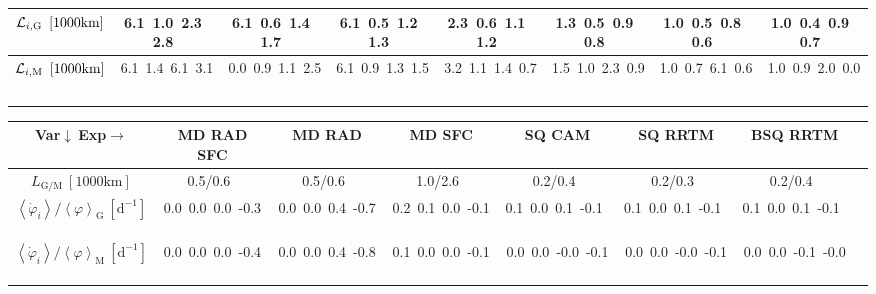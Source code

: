 \begin{table}[H]
{\begin{centering}
\begin{tabular}{|c|c|c|c|c|c|c|c|}
\hline
${\cal L}_{i,\mathrm{G}}\ \left[1000\mathrm{km}\right]$ & \textcolor{C1}{6.1}\ \textcolor{C2}{1.0}\ \textcolor{C3}{2.3}\ \textcolor{C4}{2.8}\  & \textcolor{C1}{6.1}\ \textcolor{C2}{0.6}\ \textcolor{C3}{1.4}\ \textcolor{C4}{1.7}\  & \textcolor{C1}{6.1}\ \textcolor{C2}{0.5}\ \textcolor{C3}{1.2}\ \textcolor{C4}{1.3}\  & \textcolor{C1}{2.3}\ \textcolor{C2}{0.6}\ \textcolor{C3}{1.1}\ \textcolor{C4}{1.2}\  & \textcolor{C1}{1.3}\ \textcolor{C2}{0.5}\ \textcolor{C3}{0.9}\ \textcolor{C4}{0.8}\  & \textcolor{C1}{1.0}\ \textcolor{C2}{0.5}\ \textcolor{C3}{0.8}\ \textcolor{C4}{0.6}\  & \textcolor{C1}{1.0}\ \textcolor{C2}{0.4}\ \textcolor{C3}{0.9}\ \textcolor{C4}{0.7}\  \tabularnewline
\hline
${\cal L}_{i,\mathrm{M}}\ \left[1000\mathrm{km}\right]$ & \textcolor{C1}{6.1}\ \textcolor{C2}{1.4}\ \textcolor{C3}{6.1}\ \textcolor{C4}{3.1}\  & \textcolor{C1}{0.0}\ \textcolor{C2}{0.9}\ \textcolor{C3}{1.1}\ \textcolor{C4}{2.5}\  & \textcolor{C1}{6.1}\ \textcolor{C2}{0.9}\ \textcolor{C3}{1.3}\ \textcolor{C4}{1.5}\  & \textcolor{C1}{3.2}\ \textcolor{C2}{1.1}\ \textcolor{C3}{1.4}\ \textcolor{C4}{0.7}\  & \textcolor{C1}{1.5}\ \textcolor{C2}{1.0}\ \textcolor{C3}{2.3}\ \textcolor{C4}{0.9}\  & \textcolor{C1}{1.0}\ \textcolor{C2}{0.7}\ \textcolor{C3}{6.1}\ \textcolor{C4}{0.6}\  & \textcolor{C1}{1.0}\ \textcolor{C2}{0.9}\ \textcolor{C3}{2.0}\ \textcolor{C4}{0.0}\  \tabularnewline
\hline
 &  &  &  &  &  &  & \tabularnewline
\hline
\end{tabular}
\begin{tabular}{|c|c|c|c|c|c|c|c|}
\hline
Var$\downarrow\ $Exp$\rightarrow$ & MD RAD SFC & MD RAD & MD SFC & SQ CAM & SQ RRTM & BSQ RRTM \tabularnewline
\hline
\hline
$L_{\mathrm{G/M}}\ \left[1000\mathrm{km}\right]$ & 0.5/0.6\ & 0.5/0.6\ & 1.0/2.6\ & 0.2/0.4\ & 0.2/0.3\ & 0.2/0.4\ \tabularnewline
\hline
$\left\langle \dot{\varphi}_{i}\right\rangle /\left\langle \varphi\right\rangle _{\mathrm{G}}\ \left[\mathrm{d^{-1}}\right]$ & \textcolor{C1}{0.0}\ \textcolor{C2}{0.0}\ \textcolor{C3}{0.0}\ \textcolor{C4}{-0.3}\  & \textcolor{C1}{0.0}\ \textcolor{C2}{0.0}\ \textcolor{C3}{0.4}\ \textcolor{C4}{-0.7}\  & \textcolor{C1}{0.2}\ \textcolor{C2}{0.1}\ \textcolor{C3}{0.0}\ \textcolor{C4}{-0.1}\  & \textcolor{C1}{0.1}\ \textcolor{C2}{0.0}\ \textcolor{C3}{0.1}\ \textcolor{C4}{-0.1}\  & \textcolor{C1}{0.1}\ \textcolor{C2}{0.0}\ \textcolor{C3}{0.1}\ \textcolor{C4}{-0.1}\  & \textcolor{C1}{0.1}\ \textcolor{C2}{0.0}\ \textcolor{C3}{0.1}\ \textcolor{C4}{-0.1}\  \tabularnewline
\hline
$\left\langle \dot{\varphi}_{i}\right\rangle /\left\langle \varphi\right\rangle _{\mathrm{M}}\ \left[\mathrm{d^{-1}}\right]$ & \textcolor{C1}{0.0}\ \textcolor{C2}{0.0}\ \textcolor{C3}{0.0}\ \textcolor{C4}{-0.4}\  & \textcolor{C1}{0.0}\ \textcolor{C2}{0.0}\ \textcolor{C3}{0.4}\ \textcolor{C4}{-0.8}\  & \textcolor{C1}{0.1}\ \textcolor{C2}{0.0}\ \textcolor{C3}{0.0}\ \textcolor{C4}{-0.1}\  & \textcolor{C1}{0.0}\ \textcolor{C2}{0.0}\ \textcolor{C3}{-0.0}\ \textcolor{C4}{-0.1}\  & \textcolor{C1}{0.0}\ \textcolor{C2}{0.0}\ \textcolor{C3}{-0.0}\ \textcolor{C4}{-0.1}\  & \textcolor{C1}{0.0}\ \textcolor{C2}{0.0}\ \textcolor{C3}{-0.1}\ \textcolor{C4}{-0.0}\  \tabularnewline

\end{tabular}
\end{centering}}
\end{table}
